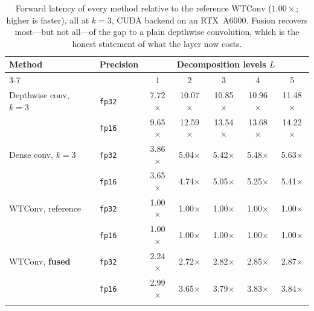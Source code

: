 \begin{table}[t]
\centering
\caption{Forward latency of every method relative to the reference WTConv ($1.00\times$; higher is faster), all at $k{=}3$, CUDA backend on an RTX~A6000. Fusion recovers most---but not all---of the gap to a plain depthwise convolution, which is the honest statement of what the layer now costs.}
\label{tab:context}
\begin{tabular}{llccccc}
\toprule
\multirow{2}{*}{Method} & \multirow{2}{*}{Precision} & \multicolumn{5}{c}{Decomposition levels $L$} \\
\cmidrule(lr){3-7}
 & & 1 & 2 & 3 & 4 & 5 \\
\midrule
Depthwise conv, $k{=}3$ & \texttt{fp32} & 7.72$\times$ & 10.07$\times$ & 10.85$\times$ & 10.96$\times$ & 11.48$\times$ \\
 & \texttt{fp16} & 9.65$\times$ & 12.59$\times$ & 13.54$\times$ & 13.68$\times$ & 14.22$\times$ \\
\addlinespace[2pt]
Dense conv, $k{=}3$ & \texttt{fp32} & 3.86$\times$ & 5.04$\times$ & 5.42$\times$ & 5.48$\times$ & 5.63$\times$ \\
 & \texttt{fp16} & 3.65$\times$ & 4.74$\times$ & 5.05$\times$ & 5.25$\times$ & 5.41$\times$ \\
\addlinespace[2pt]
WTConv, reference & \texttt{fp32} & 1.00$\times$ & 1.00$\times$ & 1.00$\times$ & 1.00$\times$ & 1.00$\times$ \\
 & \texttt{fp16} & 1.00$\times$ & 1.00$\times$ & 1.00$\times$ & 1.00$\times$ & 1.00$\times$ \\
\addlinespace[2pt]
WTConv, \textbf{fused} & \texttt{fp32} & 2.24$\times$ & 2.72$\times$ & 2.82$\times$ & 2.85$\times$ & 2.87$\times$ \\
 & \texttt{fp16} & 2.99$\times$ & 3.65$\times$ & 3.79$\times$ & 3.83$\times$ & 3.84$\times$ \\
\addlinespace[2pt]
\bottomrule
\end{tabular}
\end{table}
